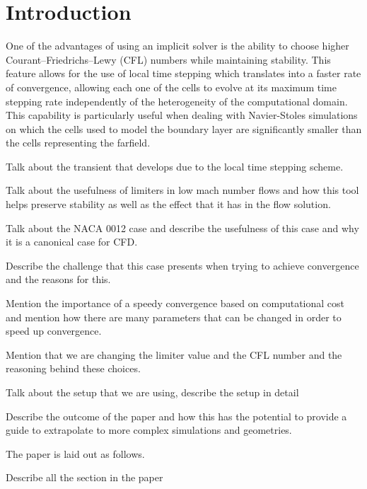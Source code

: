 
\section{Introduction}
One of the advantages of using an implicit solver is the ability to choose higher Courant–Friedrichs–Lewy (CFL) numbers while maintaining stability. This feature allows for the use of local time stepping which translates into a faster rate of convergence, allowing each one of the cells to evolve at its maximum time stepping rate independently of the heterogeneity of the computational domain. This capability is particularly useful when dealing with Navier-Stoles simulations on which the cells used to model the boundary layer are significantly smaller than the cells representing the farfield. 

Talk about the transient that develops due to the local time stepping scheme.

Talk about the usefulness of limiters in low mach number flows and how this tool helps preserve stability as well as the effect that it has in the flow solution.

Talk about the NACA 0012 case and describe the usefulness of this case and why it is a canonical case for CFD. 

Describe the challenge that this case presents when trying to achieve convergence and the reasons for this.

Mention the importance of a speedy convergence based on computational cost and mention how there are many parameters that can be changed in order to speed up convergence.

Mention that we are changing the limiter value and the CFL number and the reasoning behind these choices.

Talk about the setup that we are using, describe the setup in detail

Describe the outcome of the paper and how this has the potential to provide a guide to extrapolate to more complex simulations and geometries.

The paper is laid out as follows. 

Describe all the section in the paper


